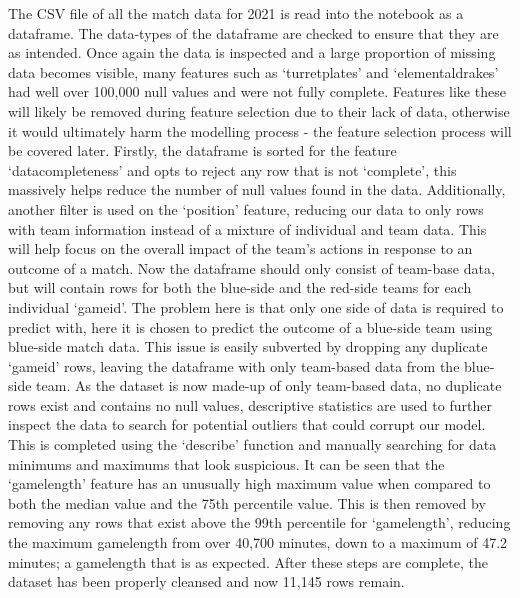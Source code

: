The CSV file of all the match data for 2021 is read into the notebook as a dataframe.
The data-types of the dataframe are checked to ensure that they are as intended.
Once again the data is inspected and a large proportion of missing data becomes visible, many features such as `turretplates' and `elementaldrakes' had well over 100,000 null values and were not fully complete.
Features like these will likely be removed during feature selection due to their lack of data, otherwise it would ultimately harm the modelling process - the feature selection process will be covered later.
Firstly, the dataframe is sorted for the feature `datacompleteness' and opts to reject any row that is not `complete', this massively helps reduce the number of null values found in the data.
Additionally, another filter is used on the `position' feature, reducing our data to only rows with team information instead of a mixture of individual and team data.
This will help focus on the overall impact of the team's actions in response to an outcome of a match.
Now the dataframe should only consist of team-base data, but will contain rows for both the blue-side and the red-side teams for each individual `gameid'.
The problem here is that only one side of data is required to predict with, here it is chosen to predict the outcome of a blue-side team using blue-side match data.
This issue is easily subverted by dropping any duplicate `gameid' rows, leaving the dataframe with only team-based data from the blue-side team.
As the dataset is now made-up of only team-based data, no duplicate rows exist and contains no null values, descriptive statistics are used to further inspect the data to search for potential outliers that could corrupt our model.
This is completed using the `describe' function and manually searching for data minimums and maximums that look suspicious.
It can be seen that the `gamelength' feature has an unusually high maximum value when compared to both the median value and the 75th percentile value.
This is then removed by removing any rows that exist above the 99th percentile for `gamelength', reducing the maximum gamelength from over 40,700 minutes, down to a maximum of 47.2 minutes;
a gamelength that is as expected.
After these steps are complete, the dataset has been properly cleansed and now 11,145 rows remain.\\

